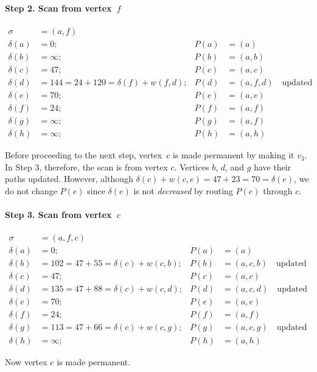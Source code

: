 \documentclass[10pt,]{book}
\theoremstyle{plain}
\theoremstyle{definition}
\theoremstyle{definition}
\theoremstyle{definition}
\theoremstyle{definition}
\numberwithin{equation}{section}
\newcommand{\amp}{&}
\begin{document}
\paragraph[{Step 2.  Scan from vertex~\(f\)}]{Step 2.  Scan from vertex~\(f\)}\hypertarget{paragraphs-2}{}
\hypertarget{p-201}{}%
%
\begin{align*}
\sigma\amp=(a,f)\amp\amp\\
\delta(a)\amp=0; \amp P(a)\amp=(a)\\
\delta(b)\amp=\infty; \amp P(b)\amp=(a,b)\\
\delta(c)\amp=47; \amp P(c)\amp=(a,c)\\
\delta(d)\amp=144 = 24 + 120 = \delta(f)+w(f,d); \amp P(d)\amp=(a,f,d)\quad\text{updated} \\
\delta(e)\amp=70; \amp P(e)\amp=(a,e)\\
\delta(f)\amp=24; \amp P(f)\amp=(a,f)\\
\delta(g)\amp=\infty; \amp P(g)\amp=(a,f)\\
\delta(h)\amp=\infty; \amp P(h)\amp=(a,h)
\end{align*}
%
\par
\hypertarget{p-202}{}%
Before proceeding to the next step, vertex~\(c\) is made permanent by making it \(v_3\). In Step 3, therefore, the scan is from vertex \(c\). Vertices \(b\), \(d\), and \(g\) have their paths updated. However, although \(\delta(c) + w(c,e) = 47+23=70=\delta(e)\), we do not change \(P(e)\) since \(\delta(e)\) is not \emph{decreased} by routing \(P(e)\) through \(c\).%
\typeout{************************************************}
\typeout{************************************************}
\paragraph[{Step 3.  Scan from vertex~\(c\)}]{Step 3.  Scan from vertex~\(c\)}\hypertarget{paragraphs-3}{}
\hypertarget{p-203}{}%
%
\begin{align*}
\sigma\amp=(a,f,c)\\
\delta(a)\amp=0; \amp P(a)\amp=(a)\\
\delta(b)\amp=102=47+55= \delta(c)+w(c,b); \amp P(b)\amp=(a,c,b)\quad\text{updated}\\
\delta(c)\amp=47; \amp P(c)\amp=(a,c)\\
\delta(d)\amp=135=47+88 = \delta(c)+w(c,d); \amp P(d)\amp=(a,c,d)\quad\text{updated} \\
\delta(e)\amp=70; \amp P(e)\amp=(a,e)\\
\delta(f)\amp=24; \amp P(f)\amp=(a,f)\\
\delta(g)\amp=113=47+66= \delta(c)+w(c,g); \amp P(g)\amp=(a,c,g)\quad\text{updated} \\
\delta(h)\amp=\infty; \amp P(h)\amp=(a,h)
\end{align*}
%
\par
\hypertarget{p-204}{}%
Now vertex \(e\) is made permanent.%
\typeout{************************************************}
\typeout{************************************************}
\end{document}
